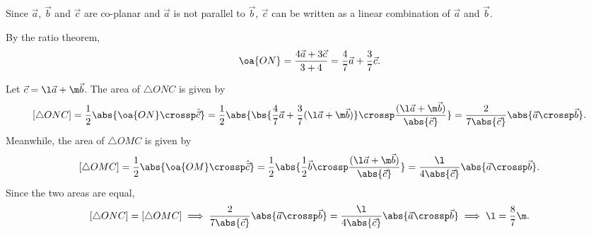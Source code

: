 \begin{solution}
    \begin{ppart}
        Since $\vec a$, $\vec b$ and $\vec c$ are co-planar and $\vec a$ is not parallel to $\vec b$, $\vec c$ can be written as a linear combination of $\vec a$ and $\vec b$.
    \end{ppart}
    \begin{ppart}
        By the ratio theorem, \[\oa{ON} = \frac{4\vec a + 3\vec c}{3 + 4} = \frac47 \vec a + \frac37 \vec c.\]
    \end{ppart}
    \begin{ppart}
        Let $\vec c = \l \vec a + \m \vec b$.
        The area of $\triangle ONC$ is given by \[[\triangle ONC] = \frac12 \abs{\oa{ON} \crossp \hat{\vec c}} = \frac12 \abs{\bs{\frac47\vec a + \frac37(\l \vec a + \m \vec b)} \crossp \frac{(\l \vec a + \m \vec b)}{\abs{\vec c}}} = \frac{2}{7\abs{\vec c}} \abs{\vec a \crossp \vec b}.\] Meanwhile, the area of $\triangle OMC$ is given by \[[\triangle OMC] = \frac12 \abs{\oa{OM} \crossp \hat{\vec c}} = \frac12 \abs{\frac12 \vec b \crossp \frac{(\l \vec a + \m \vec b)}{\abs{\vec c}}} = \frac{\l}{4\abs{\vec c}} \abs{\vec a \crossp \vec b}.\] Since the two areas are equal, \[[\triangle ONC] = [\triangle OMC] \implies \frac2{7\abs{\vec c}} \abs{\vec a \crossp \vec b} = \frac{\l}{4\abs{\vec c}} \abs{\vec a \crossp \vec b} \implies \l = \frac87 \m.\]
    \end{ppart}
\end{solution}